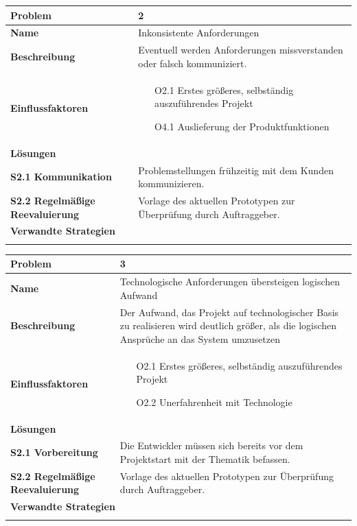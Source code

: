 \documentclass[fontsize=12pt,paper=a4,twoside]{scrartcl}
\begin{document}
\begin{tabularx}{\textwidth}{|l|X|}
 \hline
 \textbf{Problem} & 2 \\\hline
 \textbf{Name} & Inkonsistente Anforderungen\\\hline 
 \textbf{Beschreibung} & Eventuell werden Anforderungen missverstanden oder falsch kommuniziert.\\\hline
 \textbf{Einflussfaktoren} &
 \begin{itemize}
 \item[O2.1] Erstes größeres, selbständig auszuführendes Projekt
 \item[O4.1] Auslieferung der Produktfunktionen
 \end{itemize}\\\hline
\multicolumn{2}{|l|}{\textbf{Lösungen}} \\\hline
\textbf{S2.1 Kommunikation} & Problemstellungen frühzeitig mit dem Kunden kommunizieren. \\

\textbf{S2.2 Regelmäßige Reevaluierung} & Vorlage des aktuellen Prototypen zur Überprüfung durch Auftraggeber. \\\hline
 
 \multicolumn{2}{|l|}{\textbf{Verwandte Strategien}} \\\hline
  & \\\hline
\end{tabularx}

\begin{tabularx}{\textwidth}{|l|X|}
 \hline
 \textbf{Problem} & 3 \\\hline
 \textbf{Name} & Technologische Anforderungen übersteigen logischen Aufwand\\\hline 
 \textbf{Beschreibung} & Der Aufwand, das Projekt auf technologischer Basis zu realisieren wird deutlich größer, als die logischen Ansprüche an das System umzusetzen\\\hline
 \textbf{Einflussfaktoren} &
 \begin{itemize}
 \item[O2.1] Erstes größeres, selbständig auszuführendes Projekt
 \item[O2.2] Unerfahrenheit mit Technologie
 \end{itemize}\\\hline
\multicolumn{2}{|l|}{\textbf{Lösungen}} \\\hline
\textbf{S2.1 Vorbereitung} & Die Entwickler müssen sich bereits vor dem Projektstart mit der Thematik befassen. \\

\textbf{S2.2 Regelmäßige Reevaluierung} & Vorlage des aktuellen Prototypen zur Überprüfung durch Auftraggeber. \\\hline
 
 \multicolumn{2}{|l|}{\textbf{Verwandte Strategien}} \\\hline
  & \\\hline
\end{tabularx}
\end{document}
